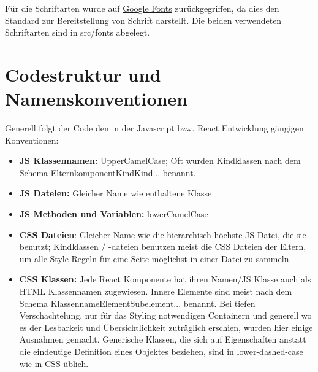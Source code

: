 Für die Schriftarten wurde auf \href{https://fonts.google.com}{Google Fonts} \cite{google-fonts}zurückgegriffen, da dies den Standard zur Bereitstellung von Schrift darstellt. Die beiden verwendeten Schriftarten sind in src/fonts abgelegt. 


\section{Codestruktur und Namenskonventionen}

Generell folgt der Code den in der Javascript bzw. React Entwicklung gängigen Konventionen:
\begin{itemize}
    \item \textbf{JS Klassennamen:} UpperCamelCase; Oft wurden Kindklassen nach dem Schema ElternkomponentKindKind... benannt.
    \item \textbf{JS Dateien:} Gleicher Name wie enthaltene Klasse
    \item \textbf{JS Methoden und Variablen:} lowerCamelCase
    \item \textbf{CSS Dateien}: Gleicher Name wie die hierarchisch höchste JS Datei, die sie benutzt; Kindklassen / -dateien benutzen meist die CSS Dateien der Eltern, um alle Style Regeln für eine Seite möglichst in einer Datei zu sammeln.
    \item \textbf{CSS Klassen:} Jede React Komponente hat ihren Namen/JS Klasse auch als HTML Klassennamen zugewiesen. Innere Elemente sind meist nach dem Schema KlassennameElementSubelement... benannt. Bei tiefen Verschachtelung, nur für das Styling notwendigen Containern und generell wo es der Lesbarkeit und Übersichtlichkeit zuträglich erschien, wurden hier einige Ausnahmen gemacht. Generische Klassen, die sich auf Eigenschaften anstatt die eindeutige Definition eines Objektes beziehen, sind in lower-dashed-case wie in CSS üblich.
\end{itemize}

